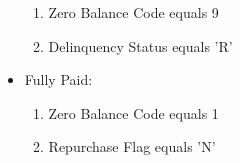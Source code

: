 \begin{appendices}
\begin{table}[h]
\begin{itemize}
                \begin{enumerate}
                    \item Zero Balance Code equals 9
                    \item Delinquency Status equals 'R'
                \end{enumerate} 
            \item Fully Paid:
                \begin{enumerate}
                    \item Zero Balance Code equals 1
                    \item Repurchase Flag equals 'N'
                \end{enumerate}                 
        \end{itemize}
    \end{table}


    

    
    
    
    
\end{appendices}
